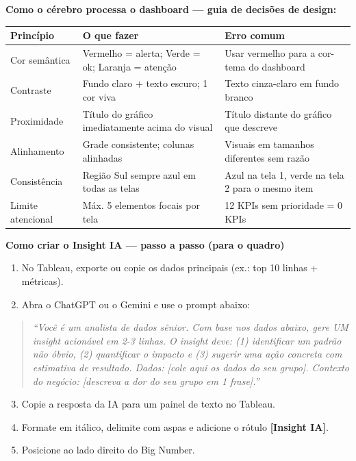 \begin{SolvedBox}
\textbf{Como o cérebro processa o dashboard — guia de decisões de design:}

\begin{tabular}{|p{3cm}|p{5cm}|p{5.5cm}|}
\hline
\textbf{Princípio} & \textbf{O que fazer} & \textbf{Erro comum} \\
\hline
Cor semântica & Vermelho = alerta; Verde = ok; Laranja = atenção & Usar vermelho para a cor-tema do dashboard \\
\hline
Contraste & Fundo claro + texto escuro; 1 cor viva & Texto cinza-claro em fundo branco \\
\hline
Proximidade & Título do gráfico imediatamente acima do visual & Título distante do gráfico que descreve \\
\hline
Alinhamento & Grade consistente; colunas alinhadas & Visuais em tamanhos diferentes sem razão \\
\hline
Consistência & Região Sul sempre azul em todas as telas & Azul na tela 1, verde na tela 2 para o mesmo item \\
\hline
Limite atencional & Máx. 5 elementos focais por tela & 12 KPIs sem prioridade = 0 KPIs \\
\hline
\end{tabular}
\end{SolvedBox}

\begin{BoardBox}
\textbf{Como criar o Insight IA — passo a passo (para o quadro)}

\begin{enumerate}
  \item No Tableau, exporte ou copie os dados principais (ex.: top 10 linhas + métricas).
  \item Abra o ChatGPT ou o Gemini e use o prompt abaixo:
\end{enumerate}

\medskip
\begin{quote}
\textit{``Você é um analista de dados sênior. Com base nos dados abaixo, gere UM insight
acionável em 2-3 linhas. O insight deve: (1) identificar um padrão não óbvio, (2)
quantificar o impacto e (3) sugerir uma ação concreta com estimativa de resultado.
Dados: [cole aqui os dados do seu grupo]. Contexto do negócio: [descreva a dor do
seu grupo em 1 frase].''}
\end{quote}

\medskip
\begin{enumerate}
  \setcounter{enumi}{2}
  \item Copie a resposta da IA para um painel de texto no Tableau.
  \item Formate em itálico, delimite com aspas e adicione o rótulo \textbf{[Insight IA]}.
  \item Posicione ao lado direito do Big Number.
\end{enumerate}
\end{BoardBox}

